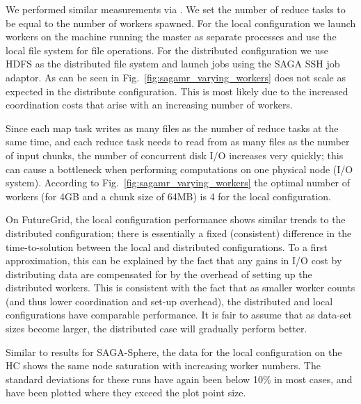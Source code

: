 \documentclass[3p,twocolumn]{elsarticle}
\begin{document}
We performed similar measurements via \sagamapreduce.  We set the
number of reduce tasks to be equal to the number of workers spawned.
For the local configuration we launch workers on the machine running
the master as separate processes and use the local file system for
file operations.  For the distributed configuration we use HDFS as the
distributed file system and launch jobs using the SAGA SSH job
adaptor. As can be seen in Fig.~\ref{fig:sagamr_varying_workers}
\sagamapreduce does not scale as expected in the distribute
configuration.  This is most likely due to the increased coordination
costs that arise with an increasing number of workers.

Since each map task writes as many files as the number of reduce tasks
at the same time, and each reduce task needs to read from as many
files as the number of input chunks, the number of concurrent disk I/O
increases very quickly; this can cause a bottleneck when performing
computations on one physical node (I/O system).  According to
Fig.~\ref{fig:sagamr_varying_workers} the optimal number of workers
(for 4GB and a chunk size of 64MB) is 4 for the local configuration.
 
On FutureGrid, the local configuration performance shows similar
trends to the distributed configuration; there is essentially a fixed
(consistent) difference in the time-to-solution between the local and
distributed configurations. To a first approximation, this can be
explained by the fact that any gains in I/O cost by distributing data
are compensated for by the overhead of setting up the distributed
workers. This is consistent with the fact that as smaller worker
counts (and thus lower coordination and set-up overhead), the
distributed and local configurations have comparable performance.  It
is fair to assume that as data-set sizes become larger, the
distributed case will gradually perform better. %

Similar to results for SAGA-Sphere, the \sagamapreduce data for the
local configuration on the HC shows the same node saturation
 with increasing worker numbers. The
standard deviations for these runs have again been below 10\% in most
cases, and have been plotted where they exceed the plot point
size.  
\end{document}

